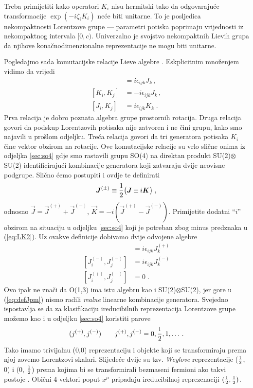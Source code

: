 Treba primijetiti kako operatori $K_i$ nisu hermitski tako da odgovarajuće
transformacije $\exp(-i\zeta_i K_i)$ neće biti unitarne. To je posljedica
nekompaktnosti Lorentzove grupe --- parametri potiska poprimaju
vrijednosti iz nekompaktnog intervala $[0,c)$.
Univerzalno je svojstvo nekompaktnih Lievih grupa da njihove konačnodimenzionalne
reprezentacije ne mogu biti unitarne.

Pogledajmo sada komutacijske relacije Lieve algebre . Eskplicitnim
množenjem vidimo da vrijedi
\begin{align}
[J_i, J_j] &= i\epsilon_{ijk} J_k  \,, \label{eq:LK1}\\
[K_i, K_j] &= -i\epsilon_{ijk} J_k \,, \label{eq:LK2} \\
[J_i, K_j] &= i\epsilon_{ijk} K_k \;. \label{eq:LK3}
\end{align}
Prva relacija je dobro poznata algebra  grupe prostornih rotacija.
Druga relacija govori da podskup Lorentzovih potisaka nije zatvoren
i ne čini grupu, kako smo najavili u prošlom odjeljku. Treća
relacija govori da tri generatora potisaka $K_i$ čine vektor obzirom
na rotacije.
Ove komutacijske relacije su vrlo slične onima iz odjeljka \ref{sec:so4} gdje smo 
rastavili grupu SO(4) na direktan produkt SU(2)$\otimes$SU(2) identificirajući
kombinacije generatora koji zatvaraju dvije neovisne podgrupe.
Slično ćemo postupiti i ovdje te definirati
\begin{equation}
  \vec{J}^{(\pm)} \equiv \fhalf \big(\vec{J}\pm i \vec{K} \big) \;,
  \label{eq:defJpm}
\end{equation}
odnosno $\vec{J}=\vec{J}^{(+)}+\vec{J}^{(-)}$, $\vec{K} = -i
(\vec{J}^{(+)}-\vec{J}^{(-)})$. Primijetite dodatni ``$i$'' obzirom
na situaciju u odjeljku \ref{sec:so4} koji je potreban zbog
minus predznaka u (\ref{eq:LK2}).
Uz ovakve definicije dobivamo dvije odvojene  algebre
\begin{align}
[J_{i}^{(+)}, J_{j}^{(+)}] &= i \epsilon_{ijk} J_{k}^{(+)} \\
[J_{i}^{(-)}, J_{j}^{(-)}] &= i \epsilon_{ijk} J_{k}^{(-)} \\
[J_{i}^{(+)}, J_{j}^{(-)}] &= 0  \;.
\end{align}
Ovo ipak ne znači  da O(1,3) ima istu algebru kao i SU(2)$\otimes$SU(2),
jer gore u (\ref{eq:defJpm})  nismo radili \emph{realne} linearne kombinacije generatora.
Svejedno ispostavlja se da za klasifikaciju ireducibilnih reprezentacija Lorentzove
grupe možemo kao i u odjeljku \ref{sec:so4} koristiti parove
\begin{equation}
(j^{(+)}, j^{(-)})  \qquad j^{(+)}, j^{(-)} = 0, \frac{1}{2}, 1, \dotsc .
\end{equation}
Tako imamo trivijalnu (0,0) reprezentaciju i objekte koji se
transformiraju prema njoj zovemo Lorentzovi skalari. Slijedeće
dvije su tzv. \emph{Weylove} reprezentacije ($\frac{1}{2}$, 0) i
(0, $\frac{1}{2}$) prema kojima bi se transformirali bezmaseni
fermioni ako takvi postoje .
Obični 4-vektori poput $x^\mu$ pripadaju ireducibilnoj
reprezenaciji $(\frac{1}{2}, \frac{1}{2})$.

